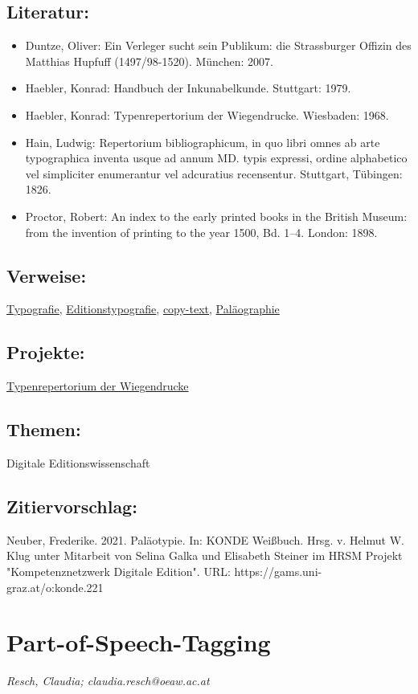 \documentclass{article}
\begin{document}
        \subsection*{Literatur:}\begin{itemize}\item Duntze, Oliver: Ein Verleger sucht sein Publikum: die Strassburger Offizin des Matthias Hupfuff (1497/98-1520). München: 2007.\item Haebler, Konrad: Handbuch der Inkunabelkunde. Stuttgart: 1979.\item Haebler, Konrad: Typenrepertorium der Wiegendrucke. Wiesbaden: 1968.\item Hain, Ludwig: Repertorium bibliographicum, in quo libri omnes ab arte typographica inventa usque ad annum MD. typis expressi, ordine alphabetico vel simpliciter enumerantur vel adcuratius recensentur. Stuttgart, Tübingen: 1826.\item Proctor, Robert: An index to the early printed books in the British Museum: from the invention of printing to the year 1500, Bd. 1–4. London: 1898.\end{itemize}\subsection*{Verweise:}\href{https://gams.uni-graz.at/o:konde.200}{Typografie}, \href{https://gams.uni-graz.at/o:konde.77}{Editionstypografie}, \href{https://gams.uni-graz.at/o:konde.43}{copy-text}, \href{https://gams.uni-graz.at/o:konde.155}{Paläographie}\subsection*{Projekte:}\href{http://tw.staatsbibliothek-berlin.de/}{Typenrepertorium der Wiegendrucke}\subsection*{Themen:}Digitale Editionswissenschaft\subsection*{Zitiervorschlag:}Neuber, Frederike. 2021. Paläotypie. In: KONDE Weißbuch. Hrsg. v. Helmut W. Klug unter Mitarbeit von Selina Galka und Elisabeth Steiner im HRSM Projekt "Kompetenznetzwerk Digitale Edition". URL: https://gams.uni-graz.at/o:konde.221\newpage\section*{Part-of-Speech-Tagging} \emph{Resch, Claudia; claudia.resch@oeaw.ac.at }\\
        
\end{document}
